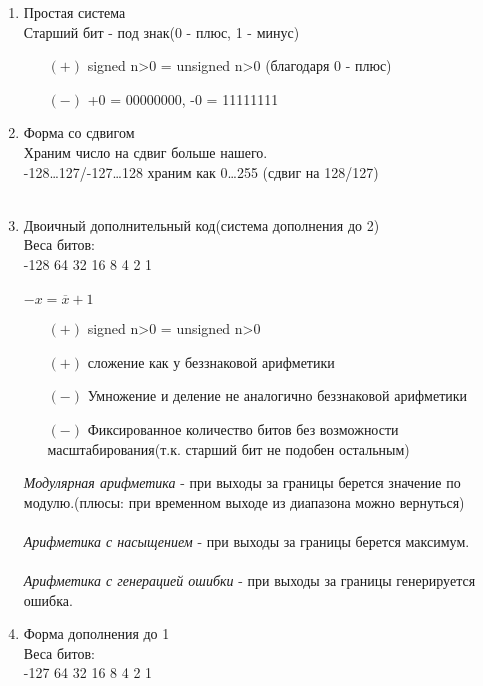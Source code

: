 \documentclass[12pt]{article}
\begin{document}
\begin{enumerate}
    \item Простая система\\
    Старший бит - под знак(0 - плюс, 1 - минус)\\
    \begin{itemize}
        \item[$(+)$] signed n>0 = unsigned n>0 (благодаря 0 - плюс)
        \item[$(-)$] +0 = 00000000, -0 = 11111111
    \end{itemize}
    \item Форма со сдвигом\\
    Храним число на сдвиг больше нашего.\\
    -128\ldots127/-127\ldots128 храним как 0\ldots255 (сдвиг на 128/127)\\\\
    \item Двоичный дополнительный код(система дополнения до 2)\\
    Веса битов:\\
    -128 64 32 16 8 4 2 1\\\\
    $-x = \overline{x}+1$
    \begin{itemize}
        \item[$(+)$] signed n>0 = unsigned n>0
        \item[$(+)$] сложение как у беззнаковой арифметики
        \item[$(-)$] Умножение и деление не аналогично беззнаковой арифметики
        \item[$(-)$] Фиксированное количество битов без возможности масштабирования(т.к. старший бит не подобен остальным)
    \end{itemize}
    \textit{Модулярная арифметика} - при выходы за границы берется значение по модулю.(плюсы: при временном выходе из диапазона можно вернуться)\\\\
    \textit{Арифметика с насыщением} - при выходы за границы берется максимум.\\\\
    \textit{Арифметика с генерацией ошибки} - при выходы за границы генерируется ошибка.\\
    \item Форма дополнения до 1\\
    Веса битов:\\
    -127 64 32 16 8 4 2 1
    \begin{itemize}

\end{itemize}
\end{enumerate}
\end{document}
